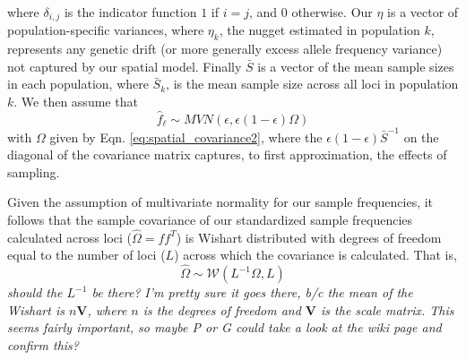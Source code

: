 \documentclass[12pt]{article}
\newcommand{\gb}[1]{{\em \color{magenta} #1}}
\newcommand{\plr}[1]{{\em \color{green} #1}}
\newcommand{\gc}[1]{{\em \color{blue} #1}}
\begin{document}
where $\delta_{i,j}$ is the indicator function $1$ if $i=j$, and $0$ otherwise. Our $\eta$ is a vector of population-specific variances, where $\eta_k$, the nugget estimated in population $k$, represents any genetic drift (or more generally excess allele frequency variance) not captured by our spatial model. Finally $\bar{S}$ is a vector of the mean sample sizes in each population, where $\bar{S}_k$, is the mean sample size across all loci in population $k$.  We then assume that
\begin{equation}
\hat{f}_{\ell} \sim MVN(\epsilon, \epsilon (1-\epsilon)\Omega)
\end{equation}
with $\Omega$ given by Eqn. \eqref{eq:spatial_covariance2},  where the $\epsilon(1-\epsilon)  \bar{S}^{-1}$ on the diagonal of the covariance matrix captures, to first approximation, the effects of sampling.

Given the assumption of multivariate normality for our sample frequencies, it follows that the sample covariance of our standardized sample frequencies calculated across loci ($\widehat{\Omega} = f f^T$)  is Wishart distributed with degrees of freedom equal to the number of loci ($L$) across which the covariance is calculated.
That is, 
\begin{equation}
\label{eq:wishart_dist}
\widehat{\Omega} \sim \mathcal{W}\left( L^{-1} \Omega, L	\right)
\end{equation}
\gc{should the $L^{-1}$ be there?} \gb{I'm pretty sure it goes there, b/c the mean of the Wishart is $n\textbf{V}$, where $n$ is the degrees of freedom and $\textbf{V}$ is the scale matrix.  This seems fairly important, so maybe \plr{P} or \gc{G} could take a look at the wiki page and confirm this?} 

\end{document}
